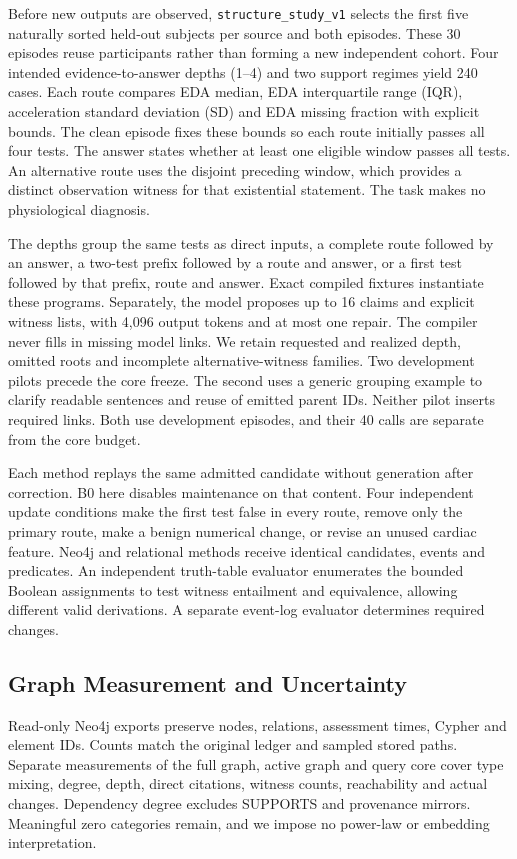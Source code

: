 Before new outputs are observed, \texttt{structure\_study\_v1} selects the first
five naturally sorted held-out subjects per source and both episodes.
These 30 episodes reuse participants rather than forming a new independent cohort.
Four intended evidence-to-answer depths (1--4) and two support regimes yield
240 cases. Each route compares EDA median, EDA interquartile range (IQR),
acceleration standard deviation (SD) and EDA missing fraction with explicit bounds.
The clean episode fixes these bounds so each route initially passes all four tests.
The answer states whether at least one eligible window passes all tests.
An alternative route uses the disjoint preceding window, which provides a distinct
observation witness for that existential statement. The task makes no physiological
diagnosis.

The depths group the same tests as direct inputs,
a complete route followed by an answer, a two-test prefix followed by a route and
answer, or a first test followed by that prefix, route and answer.
Exact compiled fixtures instantiate these programs. Separately, the model proposes
up to 16 claims and explicit witness lists, with 4,096 output tokens and at most
one repair. The compiler never fills in missing model links. We retain requested
and realized depth, omitted roots and incomplete alternative-witness families.
Two development pilots precede the core freeze. The second uses a generic grouping
example to clarify readable sentences and reuse of emitted parent IDs.
Neither pilot inserts required links. Both use development episodes, and their
40 calls are separate from the core budget.

Each method replays the same admitted candidate without generation after
correction. B0 here disables maintenance on that content.
Four independent update conditions make the first test false in every route,
remove only the primary route, make a benign numerical change, or revise an
unused cardiac feature. Neo4j and relational methods receive identical candidates,
events and predicates. An independent truth-table evaluator enumerates the bounded
Boolean assignments to test witness entailment and equivalence, allowing different
valid derivations. A separate event-log evaluator determines required changes.

\subsection{Graph Measurement and Uncertainty}

Read-only Neo4j exports preserve nodes, relations, assessment times, Cypher and
element IDs. Counts match the original ledger and sampled stored paths.
Separate measurements of the full graph, active graph and query core cover type mixing, degree, depth, direct citations, witness counts, reachability
and actual changes. Dependency degree excludes SUPPORTS and provenance mirrors.
Meaningful zero categories remain, and we impose no power-law or embedding
interpretation.

